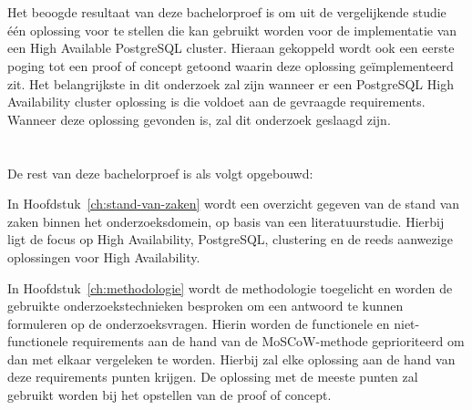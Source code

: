 \section{}
\label{sec:onderzoeksdoelstelling}

Het beoogde resultaat van deze bachelorproef is om uit de vergelijkende studie één oplossing voor te stellen die kan gebruikt worden voor de implementatie van een High Available PostgreSQL cluster. Hieraan gekoppeld wordt ook een eerste poging tot een proof of concept getoond waarin deze oplossing geïmplementeerd zit. Het belangrijkste in dit onderzoek zal zijn wanneer er een PostgreSQL High Availability cluster oplossing is die voldoet aan de gevraagde requirements. Wanneer deze oplossing gevonden is, zal dit onderzoek geslaagd zijn.


\section{}
\label{sec:opzet-bachelorproef}


De rest van deze bachelorproef is als volgt opgebouwd:

In Hoofdstuk~\ref{ch:stand-van-zaken} wordt een overzicht gegeven van de stand van zaken binnen het onderzoeksdomein, op basis van een literatuurstudie. Hierbij ligt de focus op High Availability, PostgreSQL, clustering en de reeds aanwezige oplossingen voor High Availability.

In Hoofdstuk~\ref{ch:methodologie} wordt de methodologie toegelicht en worden de gebruikte onderzoekstechnieken besproken om een antwoord te kunnen formuleren op de onderzoeksvragen. Hierin worden de functionele en niet-functionele requirements aan de hand van de MoSCoW-methode geprioriteerd om dan met elkaar vergeleken te worden. Hierbij zal elke oplossing aan de hand van deze requirements punten krijgen. De oplossing met de meeste punten zal gebruikt worden bij het opstellen van de proof of concept.

